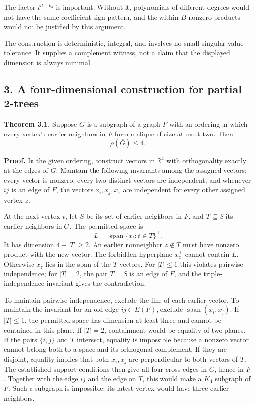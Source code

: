 \documentclass[
  10pt,
]{article}
\begin{document}
The factor \(t^{d-k_b}\) is important. Without it, polynomials of
different degrees would not have the same coefficient-sign pattern, and
the within-\(B\) nonzero products would not be justified by this
argument.

The construction is deterministic, integral, and involves no
small-singular-value tolerance. It supplies a complement witness, not a
claim that the displayed dimension is always minimal.

\subsection{3. A four-dimensional construction for partial
2-trees}\label{a-four-dimensional-construction-for-partial-2-trees}

\textbf{Theorem 3.1.} Suppose \(G\) is a subgraph of a graph \(F\) with
an ordering in which every vertex's earlier neighbors in \(F\) form a
clique of size at most two. Then \[
 \boxed{\rho(\overline G)\le4.}
\]

\textbf{Proof.} In the given ordering, construct vectors in
\(\mathbb R^4\) with orthogonality exactly at the edges of \(G\).
Maintain the following invariants among the assigned vectors: every
vector is nonzero; every two distinct vectors are independent; and
whenever \(ij\) is an edge of \(F\), the vectors \(x_i,x_j,x_z\) are
independent for every other assigned vertex \(z\).

At the next vertex \(v\), let \(S\) be its set of earlier neighbors in
\(F\), and \(T\subseteq S\) its earlier neighbors in \(G\). The
permitted space is \[
 L=\operatorname{span}\{x_t:t\in T\}^{\perp}.
\] It has dimension \(4-|T|\ge2\). An earlier nonneighbor \(z\notin T\)
must have nonzero product with the new vector. The forbidden hyperplane
\(x_z^\perp\) cannot contain \(L\). Otherwise \(x_z\) lies in the span
of the \(T\)-vectors. For \(|T|\le1\) this violates pairwise
independence; for \(|T|=2\), the pair \(T=S\) is an edge of \(F\), and
the triple-independence invariant gives the contradiction.

To maintain pairwise independence, exclude the line of each earlier
vector. To maintain the invariant for an old edge \(ij\in E(F)\),
exclude \(\operatorname{span}(x_i,x_j)\). If \(|T|\le1\), the permitted
space has dimension at least three and cannot be contained in this
plane. If \(|T|=2\), containment would be equality of two planes. If the
pairs \(\{i,j\}\) and \(T\) intersect, equality is impossible because a
nonzero vector cannot belong both to a space and its orthogonal
complement. If they are disjoint, equality implies that both \(x_i,x_j\)
are perpendicular to both vectors of \(T\). The established support
conditions then give all four cross edges in \(G\), hence in \(F\).
Together with the edge \(ij\) and the edge on \(T\), this would make a
\(K_4\) subgraph of \(F\). Such a subgraph is impossible: its latest
vertex would have three earlier neighbors.
\end{document}
